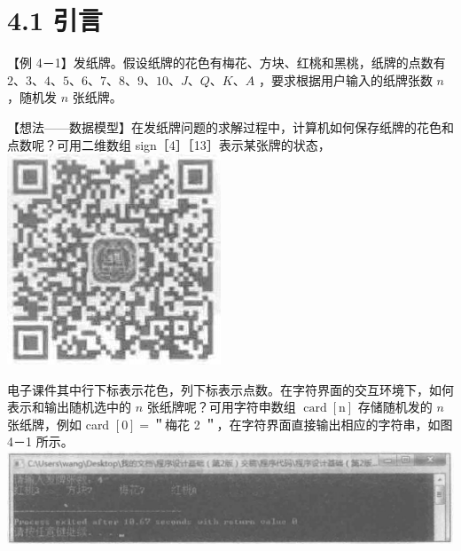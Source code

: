 \documentclass[10pt]{article}
\begin{document}
\section*{4.1 引言}
【例 4－1】发纸牌。假设纸牌的花色有梅花、方块、红桃和黑桃，纸牌的点数有 $2 、 3 、 4 、 5 、 6 、 7 、 8 、 9 、 10 、 J 、 Q 、 K 、 A$ ，要求根据用户输入的纸牌张数 $n$ ，随机发 $n$ 张纸牌。

【想法——数据模型】在发纸牌问题的求解过程中，计算机如何保存纸牌的花色和点数呢？可用二维数组 sign［4］［13］表示某张牌的状态，\\
\includegraphics[max width=\textwidth, center]{2025_06_06_704745ea57b15b2333e5g-113}

电子课件其中行下标表示花色，列下标表示点数。在字符界面的交互环境下，如何表示和输出随机选中的 $n$ 张纸牌呢？可用字符申数组 $\operatorname{card}[\mathrm{n}]$ 存储随机发的 $n$ 张纸牌，例如 card $[0]=$＂梅花 2 ＂，在字符界面直接输出相应的字符串，如图 4－1 所示。\\
\includegraphics[max width=\textwidth, center]{2025_06_06_704745ea57b15b2333e5g-113(1)}
\end{document}
